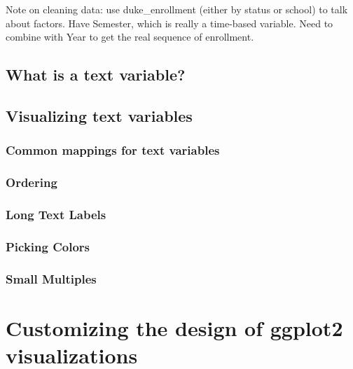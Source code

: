 \documentclass[
]{krantz}
\begin{document}
Note on cleaning data: use duke\_enrollment (either by status or school) to talk about factors.
Have Semester, which is really a time-based variable. Need to combine with Year
to get the real sequence of enrollment.

\hypertarget{what-is-a-text-variable}{%
\section{What is a text variable?}\label{what-is-a-text-variable}}

\hypertarget{visualizing-text-variables}{%
\section{Visualizing text variables}\label{visualizing-text-variables}}

\hypertarget{common-mappings-for-text-variables}{%
\subsection{Common mappings for text variables}\label{common-mappings-for-text-variables}}

\hypertarget{ordering}{%
\subsection{Ordering}\label{ordering}}

\hypertarget{long-text-labels}{%
\subsection{Long Text Labels}\label{long-text-labels}}

\hypertarget{picking-colors}{%
\subsection{Picking Colors}\label{picking-colors}}

\hypertarget{small-multiples}{%
\subsection{Small Multiples}\label{small-multiples}}

\hypertarget{customizing-visualization-design}{%
\chapter{Customizing the design of ggplot2 visualizations}\label{customizing-visualization-design}}
\end{document}
